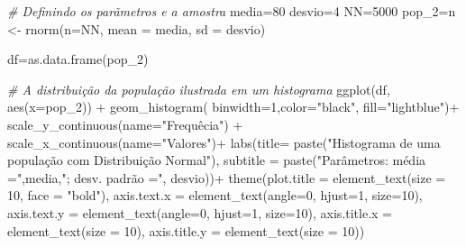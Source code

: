 \documentclass[
]{book}
\newenvironment{Shaded}{\begin{snugshade}}{\end{snugshade}}
\newcommand{\AttributeTok}[1]{\textcolor[rgb]{0.77,0.63,0.00}{#1}}
\newcommand{\CommentTok}[1]{\textcolor[rgb]{0.56,0.35,0.01}{\textit{#1}}}
\newcommand{\DecValTok}[1]{\textcolor[rgb]{0.00,0.00,0.81}{#1}}
\newcommand{\FunctionTok}[1]{\textcolor[rgb]{0.00,0.00,0.00}{#1}}
\newcommand{\NormalTok}[1]{#1}
\newcommand{\OtherTok}[1]{\textcolor[rgb]{0.56,0.35,0.01}{#1}}
\newcommand{\SpecialCharTok}[1]{\textcolor[rgb]{0.00,0.00,0.00}{#1}}
\newcommand{\StringTok}[1]{\textcolor[rgb]{0.31,0.60,0.02}{#1}}
\begin{document}
\hfill\break

\begin{Shaded}
\begin{Highlighting}[]
\CommentTok{\# Definindo os parãmetros e a amostra}
\NormalTok{media}\OtherTok{=}\DecValTok{80}
\NormalTok{desvio}\OtherTok{=}\DecValTok{4}
\NormalTok{NN}\OtherTok{=}\DecValTok{5000}
\NormalTok{pop\_2}\OtherTok{=}\NormalTok{n }\OtherTok{\textless{}{-}} \FunctionTok{rnorm}\NormalTok{(}\AttributeTok{n=}\NormalTok{NN, }\AttributeTok{mean =}\NormalTok{ media, }\AttributeTok{sd =}\NormalTok{ desvio)}

\NormalTok{df}\OtherTok{=}\FunctionTok{as.data.frame}\NormalTok{(pop\_2)}

\CommentTok{\# A distribuição da população ilustrada em um histograma}
\FunctionTok{ggplot}\NormalTok{(df, }\FunctionTok{aes}\NormalTok{(}\AttributeTok{x=}\NormalTok{pop\_2)) }\SpecialCharTok{+} 
  \FunctionTok{geom\_histogram}\NormalTok{( }\AttributeTok{binwidth=}\DecValTok{1}\NormalTok{,}\AttributeTok{color=}\StringTok{"black"}\NormalTok{, }\AttributeTok{fill=}\StringTok{"lightblue"}\NormalTok{)}\SpecialCharTok{+}
  \FunctionTok{scale\_y\_continuous}\NormalTok{(}\AttributeTok{name=}\StringTok{"Frequêcia"}\NormalTok{) }\SpecialCharTok{+}
  \FunctionTok{scale\_x\_continuous}\NormalTok{(}\AttributeTok{name=}\StringTok{"Valores"}\NormalTok{)}\SpecialCharTok{+}
  \FunctionTok{labs}\NormalTok{(}\AttributeTok{title=} \FunctionTok{paste}\NormalTok{(}\StringTok{"Histograma de uma população com Distribuição Normal"}\NormalTok{), }
       \AttributeTok{subtitle =} \FunctionTok{paste}\NormalTok{(}\StringTok{"Parâmetros: média ="}\NormalTok{,media,}\StringTok{"; desv. padrão ="}\NormalTok{, desvio))}\SpecialCharTok{+}
  \FunctionTok{theme}\NormalTok{(}\AttributeTok{plot.title =} \FunctionTok{element\_text}\NormalTok{(}\AttributeTok{size =} \DecValTok{10}\NormalTok{, }\AttributeTok{face =} \StringTok{"bold"}\NormalTok{),}
        \AttributeTok{axis.text.x =} \FunctionTok{element\_text}\NormalTok{(}\AttributeTok{angle=}\DecValTok{0}\NormalTok{, }\AttributeTok{hjust=}\DecValTok{1}\NormalTok{, }\AttributeTok{size=}\DecValTok{10}\NormalTok{),}
        \AttributeTok{axis.text.y =} \FunctionTok{element\_text}\NormalTok{(}\AttributeTok{angle=}\DecValTok{0}\NormalTok{, }\AttributeTok{hjust=}\DecValTok{1}\NormalTok{, }\AttributeTok{size=}\DecValTok{10}\NormalTok{),}
        \AttributeTok{axis.title.x =} \FunctionTok{element\_text}\NormalTok{(}\AttributeTok{size =} \DecValTok{10}\NormalTok{),}
        \AttributeTok{axis.title.y =} \FunctionTok{element\_text}\NormalTok{(}\AttributeTok{size =} \DecValTok{10}\NormalTok{))}
\end{Highlighting}
\end{Shaded}
\end{document}
